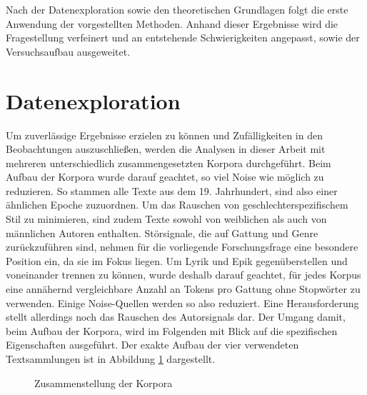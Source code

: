 \documentclass[a4paper,10p]{article}
\begin{document}
Nach der Datenexploration sowie den theoretischen Grundlagen folgt die erste Anwendung der vorgestellten Methoden. Anhand dieser Ergebnisse wird die Fragestellung verfeinert und an entstehende Schwierigkeiten angepasst, sowie der Versuchsaufbau ausgeweitet.


\section{Datenexploration}

Um zuverlässige Ergebnisse erzielen zu können und Zufälligkeiten in den Beobachtungen auszuschließen, werden die Analysen in dieser Arbeit mit mehreren unterschiedlich zusammengesetzten Korpora durchgeführt. Beim Aufbau der Korpora wurde darauf geachtet, so viel Noise wie möglich zu reduzieren. So stammen alle Texte aus dem 19. Jahrhundert, sind also einer ähnlichen Epoche zuzuordnen. Um das Rauschen von geschlechterspezifischem Stil zu minimieren, sind zudem Texte sowohl von weiblichen als auch von männlichen Autoren enthalten. Störsignale, die auf Gattung und Genre zurückzuführen sind, nehmen für die vorliegende Forschungsfrage eine besondere Position ein, da sie im Fokus liegen. Um Lyrik und Epik gegenüberstellen und voneinander trennen zu können, wurde deshalb darauf geachtet, für jedes Korpus eine annähernd vergleichbare Anzahl an Tokens pro Gattung ohne Stopwörter zu verwenden. Einige Noise-Quellen werden so also reduziert. Eine Herausforderung stellt allerdings noch das Rauschen des Autorsignals dar. Der Umgang damit, beim Aufbau der Korpora, wird im Folgenden mit Blick auf die spezifischen Eigenschaften ausgeführt. Der exakte Aufbau der vier verwendeten Textsammlungen ist in Abbildung \ref{fig:Zusammenstellung_Korpora} dargestellt.


\begin{figure}[h]
	\begin{center}
\end{center}
\caption{Zusammenstellung der Korpora}
\label{fig:Zusammenstellung_Korpora}
\end{figure}
\end{document}
